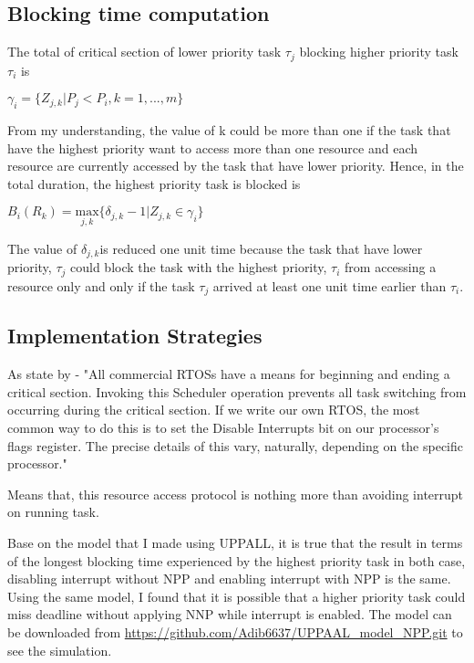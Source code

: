 \subsection{Blocking time computation}

	The total of critical section of lower priority task $\tau_{j}$ blocking higher priority task $\tau_{i}$ is

\begin{center}
$ \gamma_{i}=\{Z_{j,k} | P_{j}<P_{i}, k=1,...,m \} $ \cite{b5}
\end{center}

From my understanding, the value of k could be more than one if the task that have the highest priority want to access more than one resource and each resource are currently accessed by the task that have lower priority. Hence, in the total duration, the highest priority task is blocked is

\begin{center}

$B_{i}(R_{k})=\underset{j,k}{\mathrm{max}} \{ \delta_{j,k}-1 | Z_{j,k} \in \gamma_{i}\}  $ \cite{b5}
\end{center}

The value of $\delta_{j,k}$is reduced one unit time because the task that have lower priority, $\tau_{j}$ could block the task with the highest priority, $\tau_{i}$ from accessing a resource only and only if the task $\tau_{j}$  arrived at least one unit time earlier than $\tau_{i}$.

\subsection{Implementation Strategies}

As state by \cite{b6} - "All commercial RTOSs have a means for beginning and ending a critical section. Invoking this Scheduler operation prevents all task switching from occurring during the critical section. If we write our own RTOS, the most common way to do this is to set the Disable Interrupts bit on our processor's flags register. The precise details of this vary, naturally, depending on the specific processor."

Means that, this resource access protocol is nothing more than avoiding interrupt on running task. 

Base on the model that I made using UPPALL, it is true that the result in terms of the longest blocking time experienced by the highest priority task in both case, disabling interrupt without NPP and enabling interrupt with NPP is the same. Using the same model, I found that it is possible that a higher priority task could miss deadline without applying NNP while interrupt is enabled. The model can be downloaded from \url{https://github.com/Adib6637/UPPAAL_model_NPP.git} to see the simulation.

